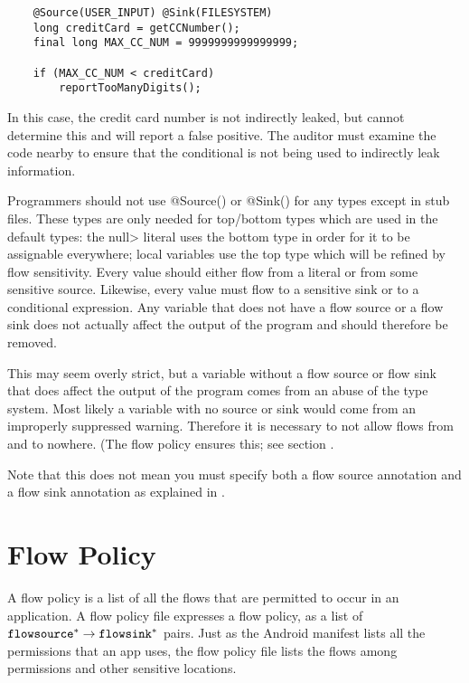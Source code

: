 \begin{Verbatim}
    @Source(USER_INPUT) @Sink(FILESYSTEM)
    long creditCard = getCCNumber();
    final long MAX_CC_NUM = 9999999999999999;

    if (MAX_CC_NUM < creditCard)
        reportTooManyDigits();
\end{Verbatim}

In this case, the credit card number is not indirectly leaked, but \theFlowChecker  
cannot determine this and will report a false positive.
The auditor must examine the code nearby
to ensure that the conditional is not being used to indirectly leak information.



Programmers should not use @Source(\ttcbs) or @Sink(\ttcbs) for
any types except in stub files.
These types are only needed for top/bottom types which are used in the
default types: the \<null> literal uses the bottom type in order for
it to be assignable everywhere; local variables use the top type which
will be refined by flow sensitivity.
Every value should either flow from a literal or from some sensitive
source.  Likewise, every value must flow to a sensitive sink or to a
conditional expression.  Any variable that does not have a flow source
or a flow sink does not actually affect the output of the program and
should therefore be removed.
  
This may seem overly strict, but a variable without a flow source or
flow sink that does affect the output of the program comes from an
abuse of the type system.  Most likely a variable with no source or
sink would come from an improperly suppressed warning. Therefore it is
necessary to not allow flows from and to nowhere.  (The flow policy
ensures this; see section .

Note that this does not mean you must specify both a flow source
annotation and a flow sink annotation as explained in
\label{sec:system:defaults}. 

 


\section{Flow Policy\label{sec:flow-policy}}

A flow policy is a list of all the flows that are permitted to occur
in an application.
A flow policy file expresses a flow policy, as a list of $\flow{\|flowsource|^*}{\|flowsink|^*}$ pairs.
Just as the Android manifest lists all the permissions that an app uses,
the flow policy file lists the flows among permissions and other sensitive 
locations. 

